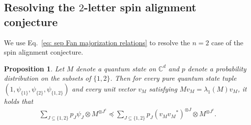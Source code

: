 \documentclass[12pt]{article}
\newtheorem{prop}[thm]{Proposition}
\theoremstyle{definition}
\numberwithin{equation}{section}
\numberwithin{equation}{section}
\newcommand{\la}{\lambda}
\newcommand{\bC}{\mathbb{C}}
\begin{document}
\subsection[Resolving the 2-letter spin alignment conjecture]{Resolving the \(2\)-letter spin alignment conjecture}
\label{subsec: spin align with 2 letters}
We use Eq.~\ref{eq: sep Fan majorization relations} to resolve the \(n=2\) case of the spin alignment conjecture. 
\begin{prop}
\label{prop: spin alignment n=2}
Let \(M\) denote a quantum state on \(\bC^d\) and \(p\) denote a probability distribution on the subsets of \(\{1,2\}\). Then for every pure quantum state tuple \((1, \psi_{\{1\}}, \psi_{\{2\}}, \psi_{\{1,2\}})\) and every unit vector \(v_M\) satisfying \(M v_M = \la_1(M) v_M\), it holds that
\begin{align}
\label{maj: n=2} 
\sum_{J \subseteq \{1,2\}} p_{J}\psi_{J} \otimes M^{\otimes J^c} \preceq \sum_{J \subseteq \{1,2\}} p_{J}({v_M {v_M}^*})^{\otimes J}  \otimes M^{\otimes J^c}.
\end{align} 
\end{prop}
\end{document}

